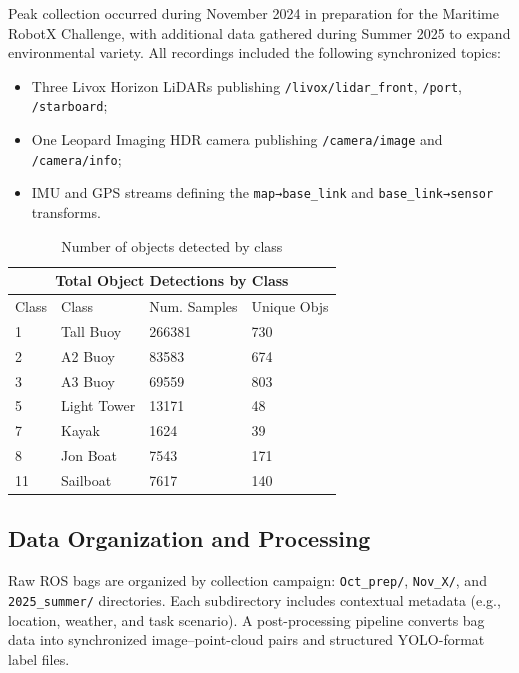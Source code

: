 \documentclass{erauthesis}
\begin{document}
Peak collection occurred during November 2024 in preparation for the Maritime RobotX Challenge, 
with additional data gathered during Summer 2025 to expand environmental variety.  
All recordings included the following synchronized topics:
\begin{itemize}[noitemsep,leftmargin=1.5em]
    \item Three Livox Horizon LiDARs publishing \texttt{/livox/lidar\_front}, \texttt{/port}, \texttt{/starboard};
    \item One Leopard Imaging HDR camera publishing \texttt{/camera/image} and \texttt{/camera/info};
    \item IMU and GPS streams defining the \texttt{map→base\_link} and \texttt{base\_link→sensor} transforms.
\end{itemize}


\begin{table}[ht]
\centering
\begin{tabular}{llll}
\hline
\multicolumn{4}{c}{Total Object Detections by Class}\\
\hline
\hline
Class & Class       & Num. Samples & Unique Objs \\
1     & Tall Buoy   & 266381       & 730         \\
2     & A2 Buoy     & 83583        & 674         \\
3     & A3 Buoy     & 69559        & 803         \\
5     & Light Tower & 13171        & 48          \\
7     & Kayak       & 1624         & 39          \\
8     & Jon Boat    & 7543         & 171         \\
11    & Sailboat    & 7617         & 140  \\      
\hline
\end{tabular}
\caption{Number of objects detected by class}
\label{tab:obj_class_dets}
\end{table}

\subsection{Data Organization and Processing}
\label{sec:data_organization}

Raw ROS bags are organized by collection campaign:
\texttt{Oct\_prep/}, \texttt{Nov\_X/}, and \texttt{2025\_summer/} directories.  
Each subdirectory includes contextual metadata (e.g., location, weather, and task scenario).  
A post-processing pipeline converts bag data into synchronized image–point-cloud pairs and structured YOLO-format label files.  
\end{document}
